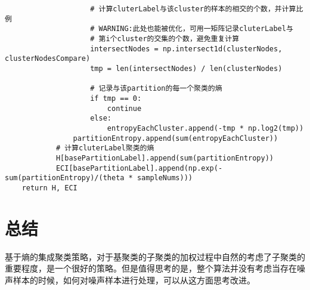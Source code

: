\documentclass[UTF8, 12pt]{ctexart}
\begin{document}
\begin{lstlisting}
					# 计算cluterLabel与该cluster的样本的相交的个数，并计算比例
					# WARNING:此处也能被优化，可用一矩阵记录cluterLabel与
					# 第i个cluster的交集的个数，避免重复计算
					intersectNodes = np.intersect1d(clusterNodes, clusterNodesCompare)
					tmp = len(intersectNodes) / len(clusterNodes)

					# 记录与该partition的每一个聚类的熵
					if tmp == 0:
						continue
					else:
						entropyEachCluster.append(-tmp * np.log2(tmp))
				partitionEntropy.append(sum(entropyEachCluster))
			# 计算cluterLabel聚类的熵
			H[basePartitionLabel].append(sum(partitionEntropy))
			ECI[basePartitionLabel].append(np.exp(-sum(partitionEntropy)/(theta * sampleNums)))
	return H, ECI
\end{lstlisting}

	\section{总结}
	基于熵的集成聚类策略，对于基聚类的子聚类的加权过程中自然的考虑了子聚类的重要程度，是一个很好的策略。但是值得思考的是，整个算法并没有考虑当存在噪声样本的时候，如何对噪声样本进行处理，可以从这方面思考改进。
	
	
	  
	  
\end{document}
